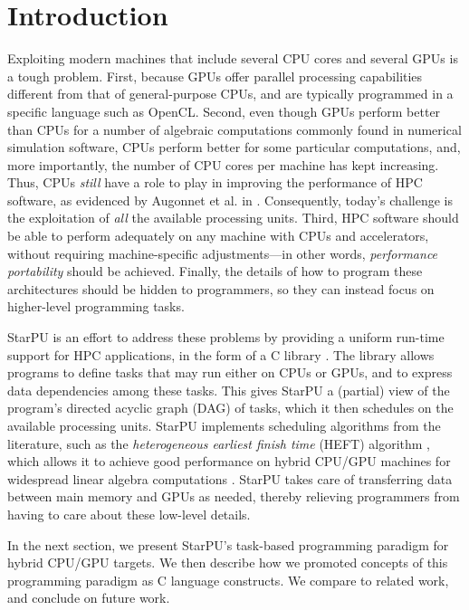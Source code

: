 \documentclass[twoside, a4paper, 10pt]{article}
\begin{document}
  \makeRR
  \clearpage
  \tableofcontents

\section{Introduction}
\label{sec-1}


Exploiting modern machines that include several CPU cores and several
GPUs is a tough problem.  First, because GPUs offer parallel processing
capabilities different from that of general-purpose CPUs, and are
typically programmed in a specific language such as OpenCL.  Second,
even though GPUs perform better than CPUs for a number of algebraic
computations commonly found in numerical simulation software, CPUs
perform better for some particular computations, and, more importantly,
the number of CPU cores per machine has kept increasing.  Thus, CPUs
\emph{still} have a role to play in improving the performance of HPC
software, as evidenced by Augonnet et al. in
\cite{AugThiNamWac09Europar}.  Consequently, today's challenge is the
exploitation of \emph{all} the available processing units.  Third, HPC
software should be able to perform adequately on any machine with CPUs
and accelerators, without requiring machine-specific adjustments---in
other words, \emph{performance portability} should be achieved.  Finally, the
details of how to program these architectures should be hidden to
programmers, so they can instead focus on higher-level programming
tasks.

StarPU is an effort to address these problems by providing a uniform
run-time support for HPC applications, in the form of a C library
\cite{AugThiNamWac09Europar}.  The library allows programs to define
tasks that may run either on CPUs or GPUs, and to express data
dependencies among these tasks.  This gives StarPU a (partial) view of the
program's directed acyclic graph (DAG) of tasks, which it then schedules on
the available processing units.  StarPU implements scheduling algorithms
from the literature, such as the \emph{heterogeneous earliest finish time}
(HEFT) algorithm \cite{Topcuouglu:2002:PLT:566137.566142}, which allows
it to achieve good performance on hybrid CPU/GPU machines for widespread
linear algebra computations
\cite{AguAugDonLtaNamRomThiTom10SAAHPC,AguAugDonFavLanLtaTomAICCSA11,AguAugDonFavLtaThiTom11IPDPS}.
StarPU takes care of transferring data between main memory and GPUs as
needed, thereby relieving programmers from having to care about these
low-level details.

In the next section, we present StarPU's task-based programming paradigm
for hybrid CPU/GPU targets.  We then describe how we promoted concepts
of this programming paradigm as C language constructs.  We compare to
related work, and conclude on future work.
\end{document}
